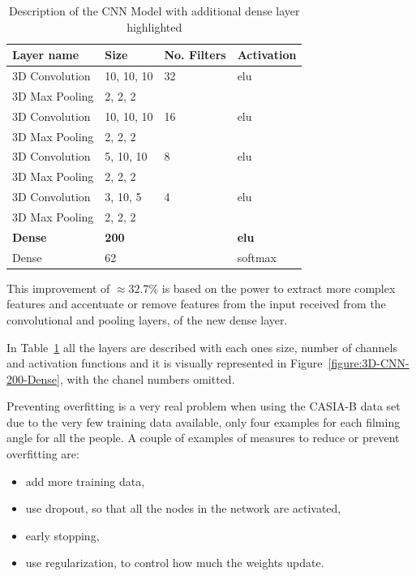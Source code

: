 \documentclass[12pt]{article}
\theoremstyle{definition}
\begin{document}
	\begin{table}[ht]
		\centering
		\renewcommand{\arraystretch}{1.35}

		\caption{Description of the CNN Model with additional dense layer highlighted}
		\label{table:dense-CNN}

		\begin{tabularx}{\textwidth}{XXXX}
			\textbf{Layer name} & \textbf{Size} & \textbf{No. Filters} & \textbf{Activation} \\ \hline
			3D Convolution    & 10, 10, 10   & 32                   & elu                  \\ \hline
			3D Max Pooling    & 2, 2, 2      & \textbf{\textendash} & \textbf{\textendash} \\ \hline
			3D Convolution    & 10, 10, 10   & 16                   & elu                  \\ \hline
			3D Max Pooling    & 2, 2, 2      & \textbf{\textendash} & \textbf{\textendash} \\ \hline
			3D Convolution    & 5, 10, 10    & 8                    & elu                  \\ \hline
			3D Max Pooling    & 2, 2, 2      & \textbf{\textendash} & \textbf{\textendash} \\ \hline
			3D Convolution    & 3, 10, 5     & 4                    & elu                  \\ \hline
			3D Max Pooling    & 2, 2, 2      & \textbf{\textendash} & \textbf{\textendash} \\ \hline
			\rowcolor{Gray}
			\textbf{Dense} & \textbf{200} & \textbf{\textendash} & \textbf{elu}         \\ \hline
			Dense          & 62           & \textbf{\textendash} & softmax              \\
		\end{tabularx}
	\end{table}

	This improvement of $\approx 32.7\%$ is based on the power to extract more complex features and accentuate or remove features from the input received from the convolutional and pooling layers, of the new dense layer.

	In Table~\ref{table:dense-CNN} all the layers are described with each ones size, number of channels and activation functions and it is visually represented in Figure~\ref{figure:3D-CNN-200-Dense}, with the chanel numbers omitted.

	Preventing overfitting is a very real problem when using the CASIA-B data set \cite{casia1}\cite{casia2}\cite{casia3} due to the very few training data available, only four examples for each filming angle for all the people. A couple of examples of measures to reduce or prevent overfitting are:
	\begin{itemize}
		\item add more training data,
		\item use dropout, so that all the nodes in the network are activated,
		\item early stopping,
		\item use regularization, to control how much the weights update.
	\end{itemize}
\end{document}
